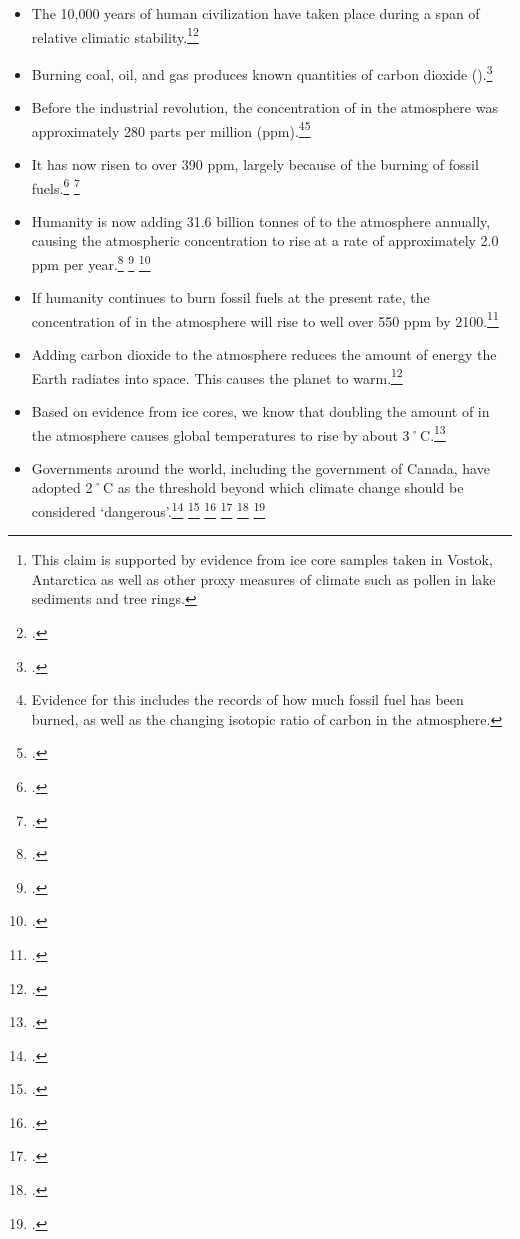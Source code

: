 \begin{itemize}
	\item The 10,000 years of human civilization have taken place during a span of relative climatic stability.\footnote{This claim is supported by evidence from ice core samples taken in Vostok, Antarctica as well as other proxy measures of climate such as pollen in lake sediments and tree rings.}\footcite[][p. 4]{Alley2000}
	\item Burning coal, oil, and gas produces known quantities of carbon dioxide ().\footcite[For example, the U.S. Environmental Protection Agency lists quantities of  produced by burning a barrel of oil, metric tonne of coal, or therm (100,000 British thermal units) of natural gas:][]{CalculationsReferences}
	\item Before the industrial revolution, the concentration of  in the atmosphere was approximately 280 parts per million (ppm).\footnote{Evidence for this includes the records of how much fossil fuel has been burned, as well as the changing isotopic ratio of carbon in the atmosphere.}\footcite[][]{IPCC4ARdrivers}
	\item It has now risen to over 390 ppm, largely because of the burning of fossil fuels.\footcite[][]{KeelingExplanation} \footcite[][p. xiv]{WorldBank4C}
	\item Humanity is now adding 31.6 billion tonnes of  to the atmosphere annually, causing the atmospheric concentration to rise at a rate of approximately 2.0 ppm per year.\footcite[][]{RedrawingClimateEnergy} \footcite[][]{NOAATrends} \footcite[See also: ][]{FaustianGrowth}
	\item If humanity continues to burn fossil fuels at the present rate, the concentration of  in the atmosphere will rise to well over 550 ppm by 2100.\footcite[][]{IPCCCO2proj}
	\item Adding carbon dioxide to the atmosphere reduces the amount of energy the Earth radiates into space. This causes the planet to warm.\footcite[][]{IPCC4ARdrivers}
	\item Based on evidence from ice cores, we know that doubling the amount of  in the atmosphere causes global temperatures to rise by about 3˚C.\footcite[][p. 473]{SafeOperatingSpace}
	\item Governments around the world, including the government of Canada, have adopted 2˚C as the threshold beyond which climate change should be considered `dangerous'.\footcite{CopenhagenAccord} \footcite[][p. 5]{CriticalDecade2013} \footcite[See also: ][p. 473]{SafeOperatingSpace} \footcite[See also: ][]{EmGapReport} \footcite[][p. 151]{ClarkeDomaradzki2011} \footcite[][]{Anderson2011}

\end{itemize}
